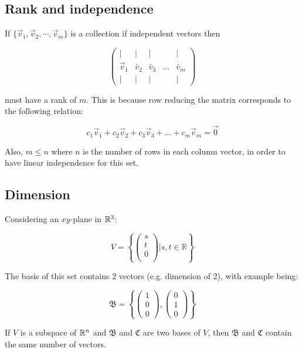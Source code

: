 \subsection{Rank and independence}

If $\{\vec{v}_1,\vec{v}_2,\cdots ,\vec{v}_m\}$ is a collection if independent vectors then

\[
\left(\begin{array}{ccccc}
\mid & \mid & \mid & & \mid \\
\vec{v}_{1} & \bar{v}_{2} & \bar{v}_{3} & \ldots & \bar{v}_{m} \\
\mid & \mid & \mid & & \mid
\end{array}\right)
\]

must have a rank of $m$. This is because row reducing the matrix corresponds to the following relation:

\[c_1\vec{v}_1+c_2\vec{v}_2+c_3\vec{v}_3+\dots +c_m\vec{v}_m=\vec{0}\]

\noindent
Also, $m\leq n$ where $n$ is the number of rows in each column vector, in order to have linear independence for this set.

\subsection{Dimension}

Considering an $xy$-plane in $\mathbb{R}^3$:

\[V=\left\{\begin{pmatrix}s\\t\\0\\ \end{pmatrix}\Bigg| s,t \in \mathbb{R} \right\}\]

The basis of this set contains 2 vectors (e.g. dimension of 2), with example being:

\[\mathfrak{B}=\left\{\begin{pmatrix}1\\0\\0 \end{pmatrix} , \begin{pmatrix} 0\\1\\0 \end{pmatrix} \right\}\]

\begin{framed}
    If $V$ is a subspace of $\mathbb{R}^n$ and $\mathfrak{B}$ and $\mathfrak{C}$ are two bases of $V$, then
    $\mathfrak{B}$ and $\mathfrak{C}$ contain the same number of vectors.
\end{framed}

